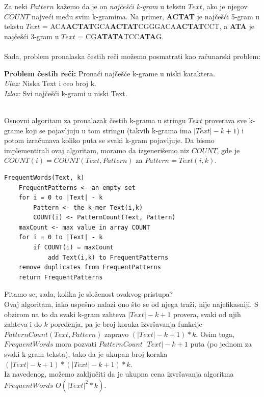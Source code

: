 Za neki $Pattern$ kažemo da je on \textit{najčešći k-gram} u tekstu $Text$, ako je njegov $COUNT$ najveći među svim k-gramima. Na primer, \textbf{ACTAT} je najčešći 5-gram u tekstu $Text$ = ACA\textbf{ACTAT}GCA\textbf{ACTAT}CGGGACA\textbf{ACTAT}CCT, a \textbf{ATA} je najčešći 3-gram u $Text$ = CG\textbf{ATATA}TCC\textbf{ATA}G.\\\\
Sada, problem pronalaska čestih reči možemo posmatrati kao računarski problem:\\
\begin{tcolorbox}
\textbf{Problem čestih reči:} Pronaći najčešće k-grame u niski karaktera.\\
\textit{Ulaz:} Niska Text i ceo broj k.\\
\textit{Izlaz:} Svi najčešći k-grami u niski Text. \\\\
\end{tcolorbox}
Osnovni algoritam za pronalazak čestih k-grama u stringu $Text$ proverava sve k-grame koji se pojavljuju u tom stringu (takvih k-grama ima $|Text|-k+1$) i potom izračunava koliko puta se svaki k-gram pojavljuje. Da bismo implementirali ovaj algoritam, moramo da izgenerišemo niz $COUNT$, gde je $COUNT(i) = COUNT(Text, Pattern)$ za $Pattern = Text(i,k)$.\\

\begin{lstlisting}
FrequentWords(Text, k)
	FrequentPatterns <- an empty set
	for i = 0 to |Text| - k
		Pattern <- the k-mer Text(i,k)
		COUNT(i) <- PatternCount(Text, Pattern)
	maxCount <- max value in array COUNT
	for i = 0 to |Text| - k
		if COUNT(i) = maxCount
			add Text(i,k) to FrequentPatterns
	remove duplicates from FrequentPatterns
	return FrequentPatterns
\end{lstlisting}

Pitamo se, sada, kolika je složenost ovakvog pristupa?\\
Ovaj algoritam, iako uspešno nalazi ono što se od njega traži, nije najefikasniji. S obzirom na to da svaki k-gram zahteva $|Text|-k+1$ provera, svaki od njih zahteva i do $k$ poređenja, pa je broj koraka izvršavanja funkcije $PatternCount(Text, Pattern)$ zapravo $(|Text|-k+1)*k$. Osim toga, $FrequentWords$ mora pozvati $PatternCount$ $|Text|-k+1$ puta (po jednom za svaki k-gram teksta), tako da je ukupan broj koraka \textit{$(|Text|-k+1)*(|Text|-k+1)*k$}.\\Iz navedenog, možemo zaključiti da je ukupna cena izvršavanja algoritma $FrequentWords$ \textbf{$O(|Text|^2*k)$}.

